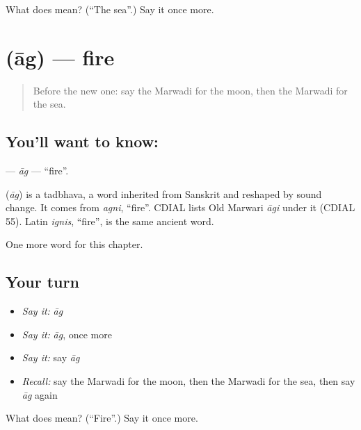 \begin{tcolorbox}[breakable,colback=teal!4,colframe=teal!35!black,title={Before you move on}]
What does  mean? (\textquotedblleft{}The sea\textquotedblright{}.) Say it once more.
\end{tcolorbox}
\section[\texorpdfstring{\mw{आग} (āg)}{आग (āg)}]{ (āg) — fire}

\label{lesson:MW-C69-ag}



\begin{quote}
Before the new one: say the Marwadi for the moon, then the Marwadi for the sea.
\end{quote}

\subsection*{You'll want to know: }
\textbf{} — \emph{āg} — \textquotedblleft{}fire\textquotedblright{}.

\begin{cousinweb}
\textbf{} (\emph{āg}) is a tadbhava, a word inherited from Sanskrit and reshaped by sound change. It comes from \emph{agni}, \textquotedblleft{}fire\textquotedblright{}. CDIAL lists Old Marwari \emph{āgi} under it (CDIAL 55). Latin \emph{ignis}, \textquotedblleft{}fire\textquotedblright{}, is the same ancient word.
\end{cousinweb}

\begin{grammarlens}[title={What you've built}]
One more word for this chapter.
\end{grammarlens}

\subsection*{Your turn}
\begin{itemize}
\raggedright
  \item \emph{Say it:} \emph{āg}
  \item \emph{Say it:} \emph{āg}, once more
  \item \emph{Say it:} say \emph{āg}
  \item \emph{Recall:} say the Marwadi for the moon, then the Marwadi for the sea, then say \emph{āg} again
\end{itemize}

\begin{tcolorbox}[breakable,colback=teal!4,colframe=teal!35!black,title={Before you move on}]
What does  mean? (\textquotedblleft{}Fire\textquotedblright{}.) Say it once more.
\end{tcolorbox}
